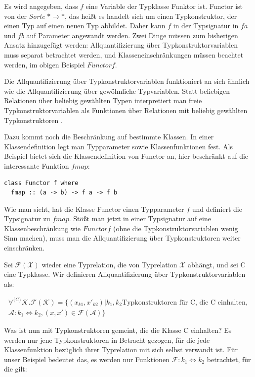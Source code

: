 Es wird angegeben, dass $f$ eine Variable der Typklasse Funktor ist. Functor ist von der \textit{Sorte} $* \rightarrow *$,
das heißt es handelt sich um einen Typkonstruktor, der einen Typ auf einen neuen Typ abbildet.
Daher kann $f$ in der Typsignatur in $f a$ und $f b$ auf Parameter angewandt werden.
Zwei Dinge müssen zum bisherigen Ansatz hinzugefügt werden: Allquantifizierung über Typkonstruktorvariablen muss separat betrachtet werden, und Klasseneinschränkungen müssen beachtet werden, im obigen Beispiel $Functor f$.

Die Allquantifizierung über Typkonstruktorvariablen funktioniert an sich ähnlich wie die Allquantifizierung über gewöhnliche
Typvariablen. Statt beliebigen Relationen über beliebig gewählten Typen interpretiert man freie Typkonstruktorvariablen als
Funktionen über Relationen mit beliebig gewählten Typkonstruktoren \cite{voigtlander}.

Dazu kommt noch die Beschränkung auf bestimmte Klassen. In einer Klassendefinition legt man Typparameter sowie
Klassenfunktionen fest. Als Beispiel bietet sich die Klassendefinition von Functor an, hier beschränkt auf die interessante Funktion
$fmap$:

\begin{verbatim}
class Functor f where
  fmap :: (a -> b) -> f a -> f b
\end{verbatim}

Wie man sieht, hat die Klasse Functor einen Typparameter $f$ und definiert die Typsignatur zu $fmap$. Stößt man jetzt in
einer Typsignatur auf eine Klassenbeschränkung wie $Functor f$ (ohne die Typkonstruktorvariablen wenig Sinn machen),
muss man die Allquantifizierung über Typkonstruktoren weiter einschränken.

Sei $\mathcal{F}(\mathcal{X})$ wieder eine Typrelation, die von Typrelation $\mathcal{X}$ abhängt, und sei C eine Typklasse. Wir definieren Allquantifizierung über Typkonstruktorvariablen als:

\begin{align*}
\forall^{\{C\}} \mathcal{K} . \mathcal{F}(\mathcal{K}) = \{ 
(x_{k1}, x'_{k2}) | k_1, k_2 \text{Typkonstruktoren für C, die C einhalten},\\
\mathcal{A} : k_1 \Leftrightarrow k_2, (x, x') \in \mathcal{F}(\mathcal{A})
\}
\end{align*}

Was ist nun mit Typkonstruktoren gemeint, die die Klasse C einhalten? Es werden nur jene Typkonstruktoren in Betracht gezogen,
für die jede Klassenfunktion bezüglich ihrer Typrelation mit sich selbst verwandt ist. Für unser Beispiel bedeutet das, es werden nur
Funktionen $\mathcal{F} : k_1 \Leftrightarrow k_2$ betrachtet, für die gilt:

